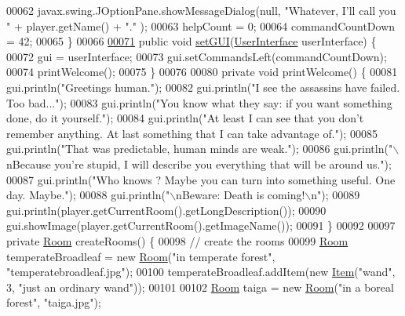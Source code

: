 \begin{DoxyCode}
00062         javax.swing.JOptionPane.showMessageDialog(null, \textcolor{stringliteral}{"Whatever, I'll call you "} + player.getName() + \textcolor{stringliteral}{"."}
      );
00063         helpCount = 0;
00064         commandCountDown = 42;
00065     \}
00066 
\hypertarget{GameEngine_8java_source_l00071}{}\hyperlink{classGameEngine_aec901a5b590b3cd204f196165da5dfb6}{00071}     \textcolor{keyword}{public} \textcolor{keywordtype}{void} \hyperlink{classGameEngine_aec901a5b590b3cd204f196165da5dfb6}{setGUI}(\hyperlink{classUserInterface}{UserInterface} userInterface) \{
00072         gui = userInterface;
00073         gui.setCommandsLeft(commandCountDown);
00074         printWelcome();
00075     \}
00076 
00080     \textcolor{keyword}{private} \textcolor{keywordtype}{void} printWelcome() \{
00081         gui.println(\textcolor{stringliteral}{"Greetings human."});
00082         gui.println(\textcolor{stringliteral}{"I see the assassins have failed. Too bad..."});
00083         gui.println(\textcolor{stringliteral}{"You know what they say: if you want something done, do it yourself."});
00084         gui.println(\textcolor{stringliteral}{"At least I can see that you don't remember anything. At last something that I can take
       advantage of."});
00085         gui.println(\textcolor{stringliteral}{"That was predictable, human minds are weak."});
00086         gui.println(\textcolor{stringliteral}{"\(\backslash\)nBecause you're stupid, I will describe you everything that will be around us."});
00087         gui.println(\textcolor{stringliteral}{"Who knows ? Maybe you can turn into something useful. One day. Maybe."});
00088         gui.println(\textcolor{stringliteral}{"\(\backslash\)nBeware: Death is coming!\(\backslash\)n"});
00089         gui.println(player.getCurrentRoom().getLongDescription());
00090         gui.showImage(player.getCurrentRoom().getImageName());
00091     \}
00092 
00097     \textcolor{keyword}{private} \hyperlink{classpkg__world_1_1Room}{Room} createRooms() \{
00098         \textcolor{comment}{// create the rooms}
00099         \hyperlink{classpkg__world_1_1Room}{Room} temperateBroadleaf = \textcolor{keyword}{new} \hyperlink{classpkg__world_1_1Room}{Room}(\textcolor{stringliteral}{"in temperate forest"}, \textcolor{stringliteral}{"temperatebroadleaf.jpg"});
00100         temperateBroadleaf.addItem(\textcolor{keyword}{new} \hyperlink{classpkg__world_1_1Item}{Item}(\textcolor{stringliteral}{"wand"}, 3, \textcolor{stringliteral}{"just an ordinary wand"}));
00101 
00102         \hyperlink{classpkg__world_1_1Room}{Room} taiga = \textcolor{keyword}{new} \hyperlink{classpkg__world_1_1Room}{Room}(\textcolor{stringliteral}{"in a boreal forest"}, \textcolor{stringliteral}{"taiga.jpg"});

\end{DoxyCode}
